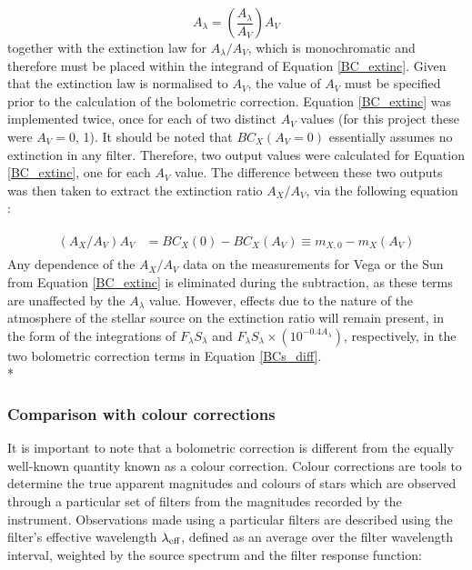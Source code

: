 \documentclass[12pt, a4paper]{report}
\begin{document}
\begin{equation}
A_{\lambda} = \left( \frac{A_{\lambda}}{A_{V}} \right) A_{V}
\label{ratio_eq}
\end{equation}
together with the \cite{1989ApJ...345..245C} extinction law for $A_{\lambda}/A_{V}$, which is monochromatic and therefore must be placed within the integrand of Equation \ref{BC_extinc}. Given that the \cite{1989ApJ...345..245C} extinction law is normalised to $A_{V}$, the value of $A_{V}$ must be specified prior to the calculation of the bolometric correction. Equation \ref{BC_extinc} was implemented twice, once for each of two distinct $A_{V}$ values (for this project these were $A_{V} = 0$, 1). It should be noted that $BC_{X}(A_{V}=0)$ essentially assumes no extinction in any filter. Therefore, two output values were calculated for Equation \ref{BC_extinc}, one for each $A_{V}$ value. The difference between these two outputs was then taken to extract the extinction ratio $A_{X}/A_{V}$, via the following equation \citep{2008PASP..120..583G}:

\begin{align}
\begin{split}
\left(A_{X}/A_{V}\right)A_{V} &= BC_{X}(0) - BC_{X}(A_{V}) \equiv m_{X,0} - m_{X}(A_{V})
\label{BCs_diff}
\end{split}
\end{align}
Any dependence of the $A_{X}/A_{V}$ data on the measurements for Vega or the Sun from Equation \ref{BC_extinc} is eliminated during the subtraction, as these terms are unaffected by the $A_{\lambda}$ value. However, effects due to the nature of the atmosphere of the stellar source on the extinction ratio will remain present, in the form of the integrations of $F_{\lambda}S_{\lambda}$ and $F_{\lambda}S_{\lambda} \times \left( 10^{-0.4 A_{\lambda}} \right)$, respectively, in the two bolometric correction terms in Equation \ref{BCs_diff}. \\*

\subsubsection{Comparison with colour corrections} \label{color_corr}
It is important to note that a bolometric correction is different from the equally well-known quantity known as a colour correction. Colour corrections are tools to determine the true apparent magnitudes and colours of stars which are observed through a particular set of filters from the magnitudes recorded by the instrument. Observations made using a particular filters are described using the filter's effective wavelength $\lambda_{\textnormal{eff}}$, defined as an average over the filter wavelength interval, weighted by the source spectrum and the filter response function:
\end{document}
